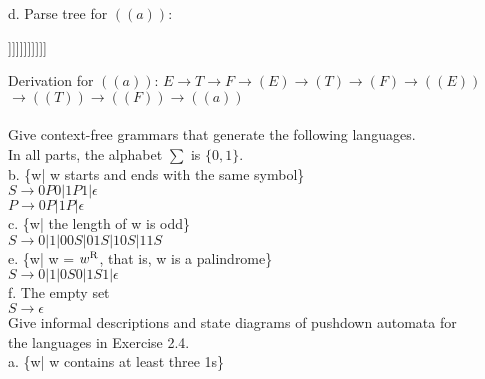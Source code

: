 \documentclass[12pt]{article}
\begin{document}
\pagebreak
\noindent
d. Parse tree for $((a))$: \\
\begin{center}
	\begin{forest}
		[E [T [F [(E) [(T) [(F) [((E)) [((T)) [((F)) [a]]]]]]]]]]]
	\end{forest}
\end{center}

\noindent
Derivation for $((a))$:  $E \rightarrow T \rightarrow F \rightarrow (E) \rightarrow (T) \rightarrow (F) \rightarrow ((E)) $  \\
$ \rightarrow ((T)) \rightarrow ((F)) \rightarrow ((a)) $ \\


\pagebreak
{} \\
Give context-free grammars that generate the following languages. \\
In all parts, the alphabet $\sum$ is $\{0,1\}$. \\

\noindent
b. \{w| w starts and ends with the same symbol\} \\
$ S \rightarrow 0P0|1P1| \epsilon $ \\
$ P \rightarrow 0P|1P| \epsilon $ \\

\noindent
c. \{w| the length of w is odd\} \\
$ S \rightarrow 0|1|00S|01S|10S|11S $ \\

\noindent
e. \{w| w = $w\textsuperscript{R}$, that is, w is a palindrome\} \\
$ S \rightarrow 0|1|0S0|1S1| \epsilon $ \\

\noindent
f. The empty set \\
$ S \rightarrow \epsilon $ \\


\pagebreak
{} Give informal descriptions and state diagrams of pushdown automata for \\
the languages in Exercise 2.4. \\

\noindent
a. \{w| w contains at least three 1s\}\\
\end{document}

